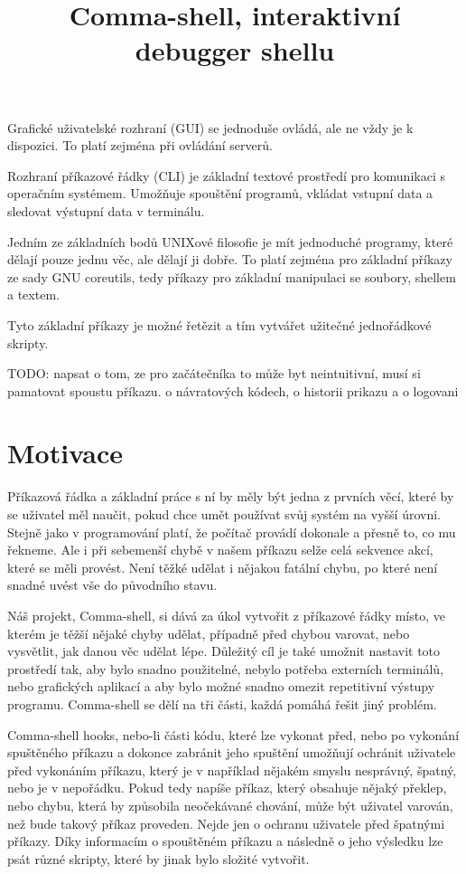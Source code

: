 \documentclass[thesis=M,czech]{FITthesis}[2012/06/26]
\title{Comma-shell, interaktivní debugger shellu}
\begin{document}

\begin{introduction}

Grafické uživatelské rozhraní (GUI) se jednoduše ovládá, ale ne vždy je k dispozici. To platí zejména při ovládání serverů.

Rozhraní příkazové řádky (CLI) je základní textové prostředí pro komunikaci s operačním systémem. Umožňuje spouštění programů, vkládat vstupní data a sledovat výstupní data v terminálu.

Jedním ze základních bodů UNIXové filosofie je mít jednoduché programy, které dělají pouze jednu věc, ale dělají ji dobře. To platí zejména pro základní příkazy ze sady GNU coreutils, tedy příkazy pro základní manipulaci se soubory, shellem a textem.

Tyto základní příkazy je možné řetězit a tím vytvářet užitečné jednořádkové skripty.

TODO: napsat o tom, ze pro začátečníka to může byt neintuitivní, musí si pamatovat spoustu příkazu. o návratových kódech, o historii prikazu a o logovani


\section{Motivace}

Příkazová řádka a základní práce s ní by měly být jedna z prvních věcí, které by se uživatel měl naučit, pokud chce umět používat svůj systém na vyšší úrovni. Stejně jako v programování platí, že počítač provádí dokonale a přesně to, co mu řekneme. Ale i při sebemenší chybě v našem příkazu selže celá sekvence akcí, které se měli provést. Není těžké udělat i nějakou fatální chybu, po které není snadné uvést vše do původního stavu.

Náš projekt, Comma-shell, si dává za úkol vytvořit z příkazové řádky místo, ve kterém je těžší nějaké chyby udělat, případně před chybou varovat, nebo vysvětlit, jak danou věc udělat lépe. Důležitý cíl je také umožnit nastavit toto prostředí tak, aby bylo snadno použitelné, nebylo potřeba externích terminálů, nebo grafických aplikací a aby bylo možné snadno omezit repetitivní výstupy programu. Comma-shell se dělí na tři části, každá pomáhá řešit jiný problém.

Comma-shell hooks, nebo-li části kódu, které lze vykonat před, nebo po vykonání spuštěného příkazu a dokonce zabránit jeho spuštění umožňují ochránit uživatele před vykonáním příkazu, který je v například nějakém smyslu nesprávný, špatný, nebo je v nepořádku. Pokud tedy napíše příkaz, který obsahuje nějaký překlep, nebo chybu, která by způsobila neočekávané chování, může být uživatel varován, než bude takový příkaz proveden. Nejde jen o ochranu uživatele před špatnými příkazy. Díky informacím o spouštěném příkazu a následně o jeho výsledku lze psát různé skripty, které by jinak bylo složité vytvořit.


\end{introduction}
\end{document}
